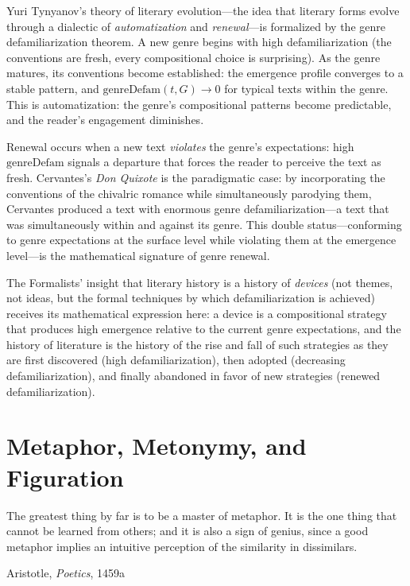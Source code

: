\begin{interpretation}
\label{interp:tynyanov}
Yuri Tynyanov's theory of literary evolution---the idea that literary forms evolve through a dialectic of \emph{automatization} and \emph{renewal}---is formalized by the genre defamiliarization theorem.  A new genre begins with high defamiliarization (the conventions are fresh, every compositional choice is surprising).  As the genre matures, its conventions become established: the emergence profile converges to a stable pattern, and $\text{genreDefam}(t, G) \to 0$ for typical texts within the genre.  This is automatization: the genre's compositional patterns become predictable, and the reader's engagement diminishes.

Renewal occurs when a new text \emph{violates} the genre's expectations: high $\text{genreDefam}$ signals a departure that forces the reader to perceive the text as fresh.  Cervantes's \textit{Don Quixote} is the paradigmatic case: by incorporating the conventions of the chivalric romance while simultaneously parodying them, Cervantes produced a text with enormous genre defamiliarization---a text that was simultaneously within and against its genre.  This double status---conforming to genre expectations at the surface level while violating them at the emergence level---is the mathematical signature of genre renewal.

The Formalists' insight that literary history is a history of \emph{devices} (not themes, not ideas, but the formal techniques by which defamiliarization is achieved) receives its mathematical expression here: a device is a compositional strategy that produces high emergence relative to the current genre expectations, and the history of literature is the history of the rise and fall of such strategies as they are first discovered (high defamiliarization), then adopted (decreasing defamiliarization), and finally abandoned in favor of new strategies (renewed defamiliarization).
\end{interpretation}


\chapter{Metaphor, Metonymy, and Figuration}
\label{ch:metaphor}

\epigraph{The greatest thing by far is to be a master of metaphor.  It is the
one thing that cannot be learned from others; and it is also a sign of genius,
since a good metaphor implies an intuitive perception of the similarity in
dissimilars.}{Aristotle, \textit{Poetics}, 1459a}

